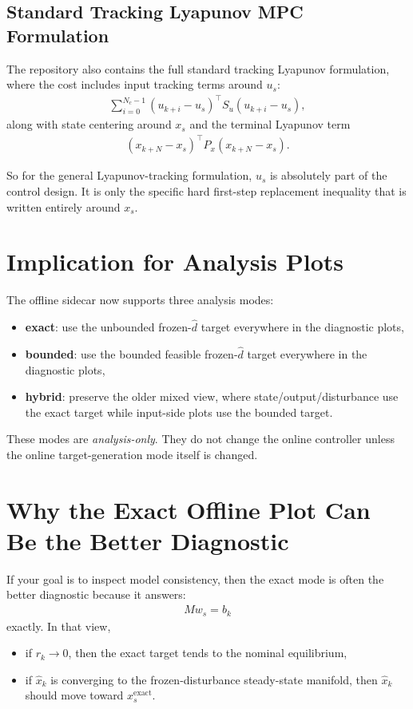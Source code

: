 \documentclass[11pt]{article}
\begin{document}
\subsection{Standard Tracking Lyapunov MPC Formulation}

The repository also contains the full standard tracking Lyapunov formulation, where the cost includes input tracking terms around $u_s$:
\begin{align}
\sum_{i=0}^{N_c-1} (u_{k+i}-u_s)^\top S_u (u_{k+i}-u_s),
\end{align}
along with state centering around $x_s$ and the terminal Lyapunov term
\begin{align}
(x_{k+N}-x_s)^\top P_x (x_{k+N}-x_s).
\end{align}

So for the general Lyapunov-tracking formulation, $u_s$ is absolutely part of the control design. It is only the specific hard first-step replacement inequality that is written entirely around $x_s$.

\section{Implication for Analysis Plots}

The offline sidecar now supports three analysis modes:
\begin{itemize}
\item \textbf{exact}: use the unbounded frozen-$\hat d$ target everywhere in the diagnostic plots,
\item \textbf{bounded}: use the bounded feasible frozen-$\hat d$ target everywhere in the diagnostic plots,
\item \textbf{hybrid}: preserve the older mixed view, where state/output/disturbance use the exact target while input-side plots use the bounded target.
\end{itemize}

These modes are \emph{analysis-only}. They do not change the online controller unless the online target-generation mode itself is changed.

\section{Why the Exact Offline Plot Can Be the Better Diagnostic}

If your goal is to inspect model consistency, then the exact mode is often the better diagnostic because it answers:
\begin{align}
Mw_s = b_k
\end{align}
exactly. In that view,
\begin{itemize}
\item if $r_k \to 0$, then the exact target tends to the nominal equilibrium,
\item if $\hat x_k$ is converging to the frozen-disturbance steady-state manifold, then $\hat x_k$ should move toward $x_s^{\mathrm{exact}}$.
\end{itemize}
\end{document}
